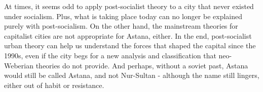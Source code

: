 \documentclass{article}
\begin{document}
At times, it seems odd to apply post-socialist theory to a city that never existed under socialism. Plus, what is taking place today can no longer be explained purely with post-socialism. On the other hand, the mainstream theories for capitalist cities are not appropriate for Astana, either.
In the end, post-socialist urban theory can help us understand the forces that shaped the capital since the 1990s, even if the city begs for a new analysis and classification that neo-Weberian theories do not provide.
And perhaps, without a soviet past, Astana would still be called Astana, and not Nur-Sultan - although the name still lingers, either out of habit or resistance.

\pagebreak

\printbibliography
\end{document}
